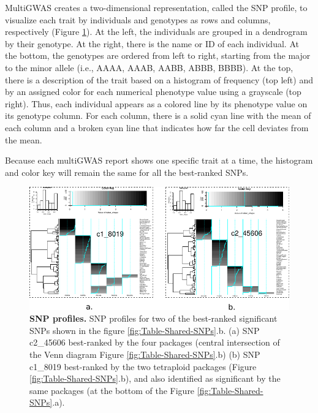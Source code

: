 \documentclass{article}
\begin{document}
MultiGWAS creates a two-dimensional representation, called the SNP profile, to visualize each trait by individuals and genotypes as rows and columns, respectively (Figure \ref{fig:SNP-profiles}). At the left, the individuals are grouped in a dendrogram by their genotype. At the right, there
is the name or ID of each individual. At the bottom, the genotypes are ordered from left to right, starting from the major to the minor allele (i.e., AAAA, AAAB, AABB, ABBB, BBBB). At the top, there is a description of the trait based on a histogram of frequency (top left) and by an assigned color for each numerical phenotype value using a grayscale (top right). Thus, each individual appears as a
colored line by its phenotype value on its genotype column. For each column, there is a solid cyan line with the mean of each column and a broken cyan line that indicates how far the cell deviates from the
mean.

Because each multiGWAS report shows one specific trait at a time, the histogram and color key will remain the same for all the best-ranked
SNPs.

\begin{figure}[H]
\begin{centering}
\includegraphics{images/paper-heat-maps}
\par\end{centering}
\caption{\textbf{\scriptsize{}SNP profiles. }{\scriptsize{}SNP profiles for
two of the best-ranked significant SNPs shown in the figure \ref{fig:Table-Shared-SNPs}.b.
(a) SNP c2\_45606 best-ranked by the four packages (central intersection
of the Venn diagram Figure \ref{fig:Table-Shared-SNPs}.b) (b) SNP
c1\_8019 best-ranked by the two tetraploid packages (Figure \ref{fig:Table-Shared-SNPs}.b),
and also identified as significant by the same packages (at the bottom
of the Figure \ref{fig:Table-Shared-SNPs}.a). \label{fig:SNP-profiles}}}
\end{figure}
\end{document}
